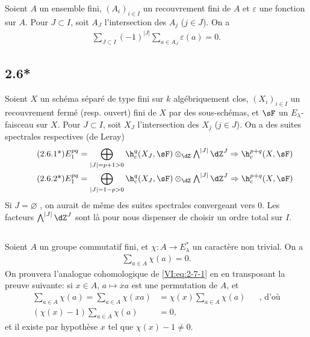 Soient $A$ un ensemble fini, $(A_i)_{i\in I}$ un recouvrement fini de $A$ et 
$\varepsilon$ une fonction sur $A$. Pour $J\subset I$, soit $A_J$ 
l'intersection des $A_j$ ($j\in J$). On a 
\begin{align*}\tag{2.6.1}\label{VI:eq:2-6-1}
  \sum_{J\subset I} (-1)^{|J|} \sum_{a\in A_J} \varepsilon(a) = 0 \text{.}
\end{align*}





\subsection*{2.6*}\label{VI:2-6*}

Soient $X$ un schéma séparé de type fini sur $k$ algébriquement clos, 
$(X_i)_{i\in I}$ un recouvrement fermé (resp. ouvert) fini de $X$ par des 
sous-schémas, et $\sF$ un $E_\lambda$-faisceau sur $X$. Pour $J\subset I$, 
soit $X_J$ l'intersection des $X_j$ ($j\in J$). On a des suites spectrales 
respectives (de Leray) 
\begin{align*}\tag{2.6.1*}\label{VI:eq:2-6-1*}
  E_1^{p q} &= \bigoplus_{|J|=p+1>0} \h_c^q(X_J,\sF) \otimes_\dZ \textstyle\bigwedge^{|J|} \dZ^J \Rightarrow \h_c^{p+q}(X,\sF) \\ 
  \tag{2.6.2*}\label{VI:eq:2-6-2*}
  E_1^{p q} &= \bigoplus_{|J|=1-p>0} \h_c^q(X_J,\sF) \otimes_\dZ \textstyle\bigwedge^{|J|} \dZ^J \Rightarrow \h_c^{p+q}(X,\sF)
\end{align*}
Si $J=\varnothing$ , on aurait de même des suites 
spectrales convergeant vers $0$. Les facteurs $\bigwedge^{|J|} \dZ^J$ sont là 
pour nous dispenser de choisir un ordre total sur $I$. 





\subsection{}\label{VI:2-7}

Soient $A$ un groupe commutatif fini, et $\chi:A \to E_\lambda^\ast$ un 
caractère non trivial. On a 
\begin{align*}\tag{2.7.1}\label{VI:eq:2-7-1}
  \sum_{a\in A} \chi(a) = 0 \text{.}
\end{align*}
On prouvera l'analogue cohomologique de \eqref{VI:eq:2-7-1} en en transposant 
la preuve suivante: si $x\in A$, $a\mapsto x a$ est une permutation de $A$, et 
\begin{align*}
  \sum_{a\in A}\chi(a) = \sum_{a\in A} \chi(x a) &= \chi(x) \sum_{a\in A} \chi(a) && \text{, d'où} \\
  (\chi(x)-1)\sum_{a\in A}\chi(a) &= 0 \text{,}
\end{align*}
et il existe par hypothèse $x$ tel que $\chi(x)-1\ne 0$. 





